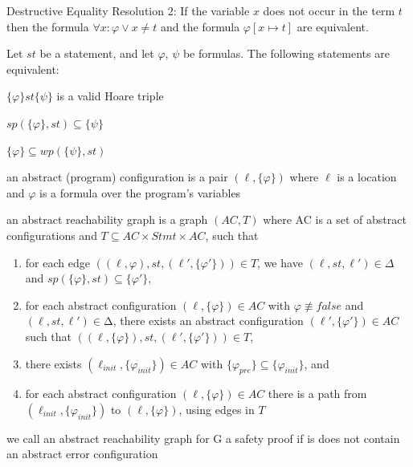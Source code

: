 \documentclass[landscape, a4paper]{article}
\begin{document}
\begin{minipage}[t]{0.2\linewidth}
\begin{betterlist}
\begin{betterlist}
			\item \alert{Destructive Equality Resolution 2:} If the variable $x$ does not occur in the term $t$ then the formula $\forall x:\varphi \lor x \ne t$ and the formula $\varphi[x\mapsto t]$ are equivalent. 
		\end{betterlist}
		\item Let $st$ be a statement, and let $\varphi$, $\psi$ be formulas. The following statements are equivalent:
		\begin{betterlist}
			\item $\{\varphi\} st \{\psi\}$ is a valid Hoare triple
			\item $sp(\{\varphi\}, st) \subseteq \{\psi\}$
			\item $\{\varphi\} \subseteq wp(\{\psi\}, st)$
		\end{betterlist}
	\end{betterlist}
	\begin{betterlist}
  \item \color{orange}an \alert{abstract (program) configuration} is a pair $(\ell, \{\varphi\})$ where $\ell$ is a location and $\varphi$ is a formula over the program’s variables\color{black}
  \item \color{orange}an \alert{abstract reachability graph} is a graph $(AC, T)$ where AC is a set of abstract configurations and $T ⊆AC × Stmt × AC$, such that
		\begin{enumerate}
			\item for each edge $((\ell, {\varphi}), st, (\ell', \{\varphi'\})) \in T$, we have $(\ell, st, \ell') \in \Delta$ and $sp(\{\varphi\}, st) \subseteq \{\varphi'\}$,
			\item for each abstract configuration $(\ell, \{\varphi\}) \in AC$ with $\varphi\not\equiv false$ and $(\ell, st, \ell') \in ∆$, there exists an abstract configuration $(\ell', \{\varphi'\}) \in AC$ such that $((\ell, \{\varphi\}), st, (\ell', \{\varphi'\})) \in T$,
			\item there exists $(\ell_{init}, \{\varphi_{init}\}) \in AC$ with $\{\varphi_{pre}\} \subseteq \{\varphi_{init}\}$, and
			\item for each abstract configuration $(\ell, \{\varphi\}) \in AC$ there is a path from $(\ell_{init}, \{\varphi_{init}\})$ to $(\ell, \{\varphi\})$, using edges in $T$
    \end{enumerate}\color{black}
		\begin{betterlist}
    \item \color{orange}we call an abstract reachability graph for G a \alert{safety proof} if is does not contain an abstract error configuration\color{black}

\end{betterlist}
\end{betterlist}
\end{minipage}
\end{document}
